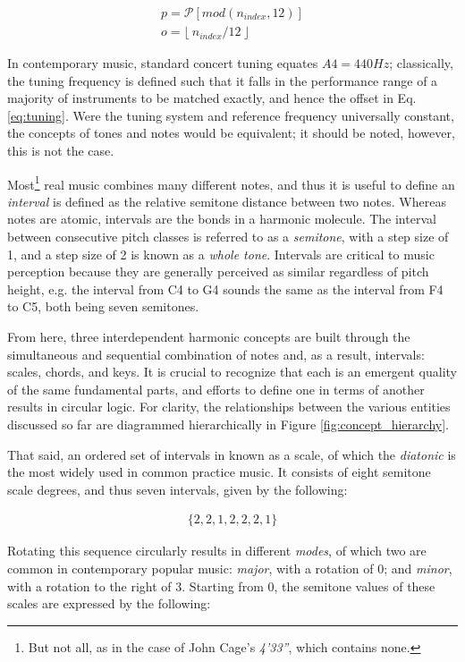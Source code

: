 \begin{align*}
p = \mathcal{P}[mod(n_{index}, 12)] \\
o = \lfloor~n_{index} / 12~\rfloor
\end{align*}

In contemporary music, standard concert tuning equates $A4=440Hz$; classically, the tuning frequency is defined such that it falls in the performance range of a majority of instruments to be matched exactly, and hence the offset in Eq. \ref{eq:tuning}.
Were the tuning system and reference frequency universally constant, the concepts of tones and notes would be equivalent; it should be noted, however, this is not the case.

Most\footnote{But not all, as in the case of John Cage's \emph{4'33''}, which contains none.} real music combines many different notes, and thus it is useful to define an \emph{interval} is defined as the relative semitone distance between two notes.
Whereas notes are atomic, intervals are the bonds in a harmonic molecule.
The interval between consecutive pitch classes is referred to as a \emph{semitone}, with a step size of 1, and a step size of 2 is known as a \emph{whole tone}.
Intervals are critical to music perception because they are generally perceived as similar regardless of pitch height, e.g. the interval from C4 to G4 sounds the same as the interval from F4 to C5, both being seven semitones.

From here, three interdependent harmonic concepts are built through the simultaneous and sequential combination of notes and, as a result, intervals: scales, chords, and keys.
It is crucial to recognize that each is an emergent quality of the same fundamental parts, and efforts to define one in terms of another results in circular logic.
For clarity, the relationships between the various entities discussed so far are diagrammed hierarchically in Figure \ref{fig:concept_hierarchy}.

That said, an ordered set of intervals in known as a scale, of which the \emph{diatonic} is the most widely used in common practice music.
It consists of eight semitone scale degrees, and thus seven intervals, given by the following:

\begin{align*}
\{2, 2, 1, 2, 2, 2, 1\}
\end{align*}

Rotating this sequence circularly results in different \emph{modes}, of which two are common in contemporary popular music: \emph{major}, with a rotation of 0; and \emph{minor}, with a rotation to the right of 3.
Starting from 0, the semitone values of these scales are expressed by the following:

